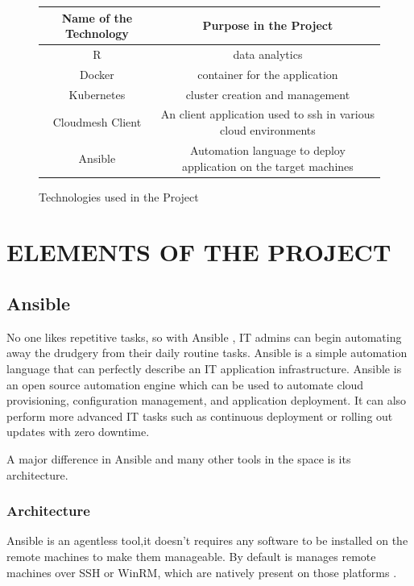 \documentclass[9pt,twocolumn,twoside]{../../styles/osajnl}
\begin{document}
\begin{figure}[ht]
\begin{center}
 \begin{tabular}{|c | c|} 
 \hline
Name of the Technology & Purpose in the Project \\ [0.5ex] 
 \hline\hline
    
R & data analytics \\
\hline

Docker & container for the application \\
\hline

Kubernetes & cluster creation and management \\[1ex]
\hline

Cloudmesh Client & An client application used to ssh in various cloud
environments \\[1ex]

\hline
Ansible & Automation language to deploy
application on the target machines \\[1ex]
\hline

\end{tabular}
\end{center}
  \caption{Technologies used in the Project}
\end{figure}

\section{ELEMENTS OF THE PROJECT}

\subsection{Ansible}
No one likes repetitive tasks, so with Ansible \cite{www-ansible}, IT
admins can begin automating away the drudgery from their daily routine
tasks. Ansible is a simple automation language that can perfectly
describe an IT application infrastructure. Ansible is an open source
automation engine which can be used to automate cloud provisioning,
configuration management, and application deployment. It can also
perform more advanced IT tasks such as continuous deployment or
rolling out updates with zero downtime.

A major difference in Ansible and many other tools in the
space is its architecture.

\subsubsection{Architecture}
Ansible is an agentless tool,it doesn't requires any software to be
installed on the remote machines to make them manageable. By default
is manages remote machines over SSH or WinRM, which are natively
present on those platforms \cite{www-ansible-architecture}.
\end{document}
